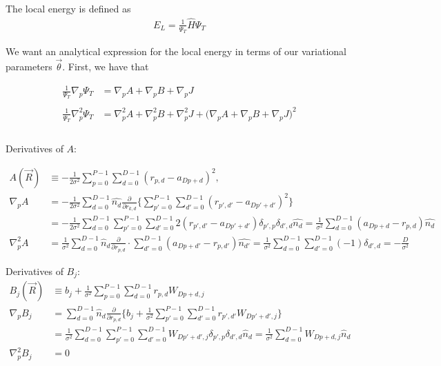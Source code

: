\documentclass[12pt]{article}
\begin{document}
\noindent The local energy is defined as
\begin{align*}
E_L = \frac{1}{\Psi_T} \hat{H} \Psi_T
\end{align*}

\noindent We want an analytical expression for the local energy in terms of our variational parameters $\vec{\theta}$. First, we have that 

\begin{align*}
 \frac{1}{ \Psi_T }\nabla_p \Psi_T  &=  \nabla_p  A  + \nabla_p  B  +\nabla_p  J \\ \\ 
 \frac{1}{ \Psi_T }\nabla_p^2  \Psi_T  &= \nabla_p^2  A  + \nabla_p^2  B  +\nabla_p^2  J   + \Big( \nabla_p A  + \nabla_p B  +\nabla_p  J  \Big)^2\\ \\
\end{align*}

\noindent Derivatives of $A$:

\begin{align*}
A(\vec{R}) &\equiv -\frac{1}{2\sigma^2} \sum_{p=0}^{P-1}\sum_{d=0}^{D-1} (r_{p,d} - a_{Dp+d})^2,\\
\nabla_p A &= -\frac{1}{2\sigma^2}
\sum_{d=0}^{D-1} \hat{n_{d}}  \frac{\partial}{\partial r_{k,d}} \bigg\{  \sum_{p'=0}^{P-1}\sum_{d'=0}^{D-1} (r_{p',d'} - a_{Dp'+d'})^2 \bigg\} \\
&= -\frac{1}{2\sigma^2} \sum_{d=0}^{D-1} \sum_{p'=0}^{P-1}\sum_{d'=0}^{D-1}  2 (r_{p',d'} - a_{Dp'+d'}) \delta_{p',p} \delta_{d',d}\hat{n_{d}}= \frac{1}{\sigma^2} \sum_{d=0}^{D-1}(a_{Dp+d}-r_{p,d}) \hat{n_{d}}\\
\nabla_p^2 A &=\frac{1}{\sigma^2} \sum_{d=0}^{D-1} \hat{n}_d \frac{\partial}{\partial r_{p,d}} \cdot \sum_{d'=0}^{D-1}(a_{Dp+d'}-r_{p,d'}) \hat{n_{d'}}=\frac{1}{\sigma^2} \sum_{d=0}^{D-1} \sum_{d'=0}^{D-1}(-1) \delta_{d',d} = - \frac{D}{\sigma^2}
\end{align*}

\noindent Derivatives of $B_j$:
\begin{align*}
B_j(\vec{R}) &\equiv b_j + \frac{1}{\sigma^2} \sum_{p=0}^{P-1}\sum_{d=0}^{D-1} r_{p,d} W_{Dp+d,j}\\
\nabla_p B_j &= \sum_{d=0}^{D-1} \hat{n}_{d} \frac{\partial}{\partial r_{p,d}} \bigg\{ b_j + \frac{1}{\sigma^2} \sum_{p'=0}^{P-1}\sum_{d'=0}^{D-1} r_{p',d'} W_{Dp'+d',j} \bigg\}\\
 &= \frac{1}{\sigma^2} \sum_{d=0}^{D-1} \sum_{p'=0}^{P-1}\sum_{d'=0}^{D-1} W_{Dp'+d',j} \delta_{p',p} \delta_{d',d} \hat{n}_d = \frac{1}{\sigma^2} \sum_{d=0}^{D-1} W_{Dp+d,j} \hat{n}_d \\
 \nabla_p^2 B_j &= 0\\
\end{align*}
\end{document}
